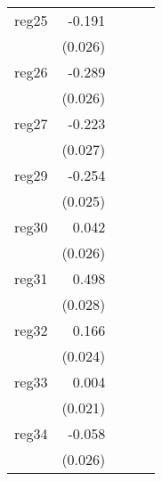 {\begin{longtable}{l*{4}{D{.}{.}{-1}}}
\addlinespace
reg25       &      -0.191\sym{***}&                     &                     &                     \\
            &     (0.026)         &                     &                     &                     \\
\addlinespace
reg26       &      -0.289\sym{***}&                     &                     &                     \\
            &     (0.026)         &                     &                     &                     \\
\addlinespace
reg27       &      -0.223\sym{***}&                     &                     &                     \\
            &     (0.027)         &                     &                     &                     \\
\addlinespace
reg29       &      -0.254\sym{***}&                     &                     &                     \\
            &     (0.025)         &                     &                     &                     \\
\addlinespace
reg30       &       0.042         &                     &                     &                     \\
            &     (0.026)         &                     &                     &                     \\
\addlinespace
reg31       &       0.498\sym{***}&                     &                     &                     \\
            &     (0.028)         &                     &                     &                     \\
\addlinespace
reg32       &       0.166\sym{***}&                     &                     &                     \\
            &     (0.024)         &                     &                     &                     \\
\addlinespace
reg33       &       0.004         &                     &                     &                     \\
            &     (0.021)         &                     &                     &                     \\
\addlinespace
reg34       &      -0.058\sym{*}  &                     &                     &                     \\
            &     (0.026)         &                     &                     &                     \\

\end{longtable}}
